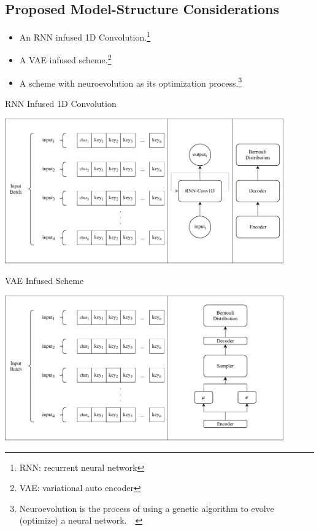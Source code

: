 \documentclass[a4paper, 12pt]{report}
\begin{document}
\subsection*{\textbf{Proposed Model-Structure Considerations}}
\begin{itemize}[nosep]
	\item An RNN infused 1D Convolution.\footnote{\scriptsize{RNN: recurrent neural network\citep{Hochreiter1997}}}
	\item A VAE infused scheme.\footnote{\scriptsize{VAE: variational auto encoder\citep{2013arXiv1312.6114K}}}
	\item A scheme with neuroevolution as its optimization process.\footnote{\scriptsize{Neuroevolution is the process of using a genetic algorithm to evolve (optimize) a neural network.~\citep{Floreano2008}~\citep{DBLP:journals/corr/abs-1803-00657}\citep{GeneticLander}}}
\end{itemize}
\newpage
\begin{blockfigure}{RNN Infused 1D Convolution}
	\begin{center}
		\includegraphics[width = 0.9\textwidth]{suggestion_rnn_conv1d}
	\end{center}
\end{blockfigure}
\begin{blockfigure}{VAE Infused Scheme}
	\begin{center}
		\includegraphics[width = 0.9\textwidth]{suggestion_vae}
	\end{center}
\end{blockfigure}
\end{document}
